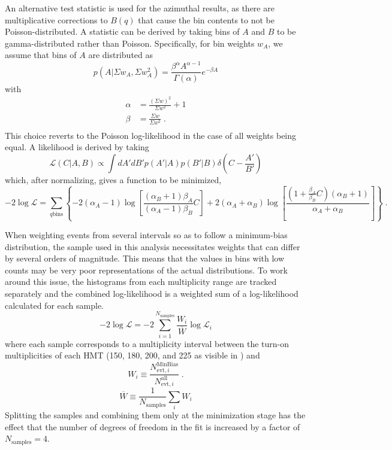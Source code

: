 An alternative test statistic is used for the azimuthal results, as there are multiplicative corrections to $B(q)$ that cause the bin contents to not be Poisson-distributed.
A statistic can be derived by taking bins of $A$ and $B$ to be gamma-distributed rather than Poisson.
Specifically, for bin weights $w_A$, we assume that bins of $A$ are distributed as
\begin{equation}
  p\left(A|\Sigma w_A, \Sigma w_A^2 \right) = \frac{\beta^\alpha A^{\alpha-1}}{\Gamma (\alpha)}e^{-\beta A}
\end{equation}
with
\begin{align*}
  \alpha &= \frac{(\Sigma w)^2}{\Sigma w^2} + 1\\
  \beta &= \frac{\Sigma w}{\Sigma w^2} \; .\\
\end{align*}
This choice reverts to the Poisson log-likelihood in the case of all weights being equal.
A likelihood is derived by taking
\begin{equation}
  \mathcal{L}\left( C | A,B \right) \propto \int dA' dB' p\left(A'|A\right) p\left(B'|B\right) \delta\left(C - \frac{A'}{B'}\right)
\end{equation}
which, after normalizing, gives a function to be minimized,
\begin{equation}
  -2\log\mathcal{L} = \sum_{q \textrm{bins}} \left\{-2(\alpha_A - 1) \log \left[ \frac{(\alpha_B +1)\beta_A}{(\alpha_A - 1)\beta_B} C \right] + 2(\alpha_A + \alpha_B) \log \left[ \frac{\left( 1 + \frac{\beta_A}{\beta_B} C\right)(\alpha_B + 1)}{\alpha_A + \alpha_B} \right] \right\} \; .
\end{equation}

When weighting events from several \Nch intervals so as to follow a minimum-bias distribution, the sample used in this analysis necessitates weights that can differ by several orders of magnitude.
This means that the values in bins with low counts may be very poor representations of the actual distributions.
To work around this issue, the histograms from each multiplicity range are tracked separately and the combined log-likelihood is a weighted sum of a log-likelihood calculated for each sample.
\begin{equation}
  -2\log\mathcal{L} = -2 \sum_{i=1}^{N_\textrm{samples}} \frac{W_i}{\overline{W}} \log\mathcal{L}_i
\end{equation}
where each sample corresponds to a multiplicity interval between the turn-on multiplicities of each \ac{HMT} (150, 180, 200, and 225 as visible in \Fig{\ref{fig:nch}}) and
\[
W_i \equiv \frac{N_{\textrm{evt},i}^\textrm{MinBias}}{N_{\textrm{evt},i}^\textrm{all}} \; .
\]
\[ \overline{W} \equiv \frac{1}{N_\textrm{samples}} \sum_i W_i \]
Splitting the samples and combining them only at the minimization stage has the effect that the number of degrees of freedom in the fit is increased by a factor of $N_\textrm{samples} = 4$.
